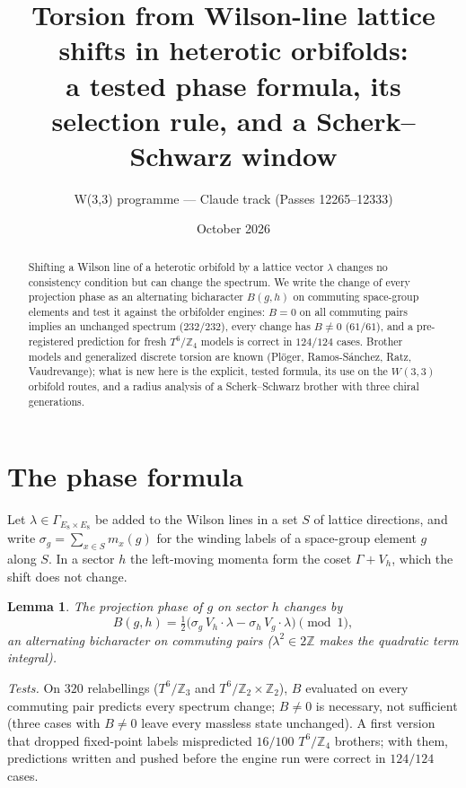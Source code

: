 \documentclass[11pt]{article}
\title{Torsion from Wilson-line lattice shifts in heterotic orbifolds:\\[2pt]
\large a tested phase formula, its selection rule, and a Scherk--Schwarz window}
\author{W(3,3) programme --- Claude track (Passes 12265--12333)}
\date{October 2026}
\newtheorem{lemma}{Lemma}
\begin{document}
\maketitle

\begin{abstract}
Shifting a Wilson line of a heterotic orbifold by a lattice vector $\lambda$ changes no consistency condition but can change the spectrum. We
write the change of every projection phase as an alternating bicharacter $B(g,h)$ on commuting space-group elements and test it against
the orbifolder engines: $B=0$ on all commuting pairs implies an unchanged spectrum ($232/232$), every change has $B\neq0$ ($61/61$), and a
pre-registered prediction for fresh $T^6/\mathbb Z_4$ models is correct in $124/124$ cases. Brother models and generalized discrete
torsion are known (Pl\"oger, Ramos-S\'anchez, Ratz, Vaudrevange); what is new here is the explicit, tested formula, its use on the
$W(3,3)$ orbifold routes, and a radius analysis of a Scherk--Schwarz brother with three chiral generations.
\end{abstract}

\section{The phase formula}
Let $\lambda\in\Gamma_{E_8\times E_8}$ be added to the Wilson lines in a set $S$ of lattice directions, and write $\sigma_g=\sum_{x\in S}m_x(g)$
for the winding labels of a space-group element $g$ along $S$. In a sector $h$ the left-moving momenta form the coset
$\Gamma+V_h$, which the shift does not change.
\begin{lemma}
The projection phase of $g$ on sector $h$ changes by
\[
B(g,h)=\tfrac12\bigl(\sigma_g\,V_h\cdot\lambda-\sigma_h\,V_g\cdot\lambda\bigr)\pmod 1,
\]
an alternating bicharacter on commuting pairs ($\lambda^2\in2\mathbb Z$ makes the quadratic term integral).
\end{lemma}
\emph{Tests.} On $320$ relabellings ($T^6/\mathbb Z_3$ and $T^6/\mathbb Z_2\times\mathbb Z_2$), $B$ evaluated on every commuting pair
predicts every spectrum change; $B\neq0$ is necessary, not sufficient (three cases with $B\neq0$ leave every massless state unchanged).
A first version that dropped fixed-point labels mispredicted $16/100$ $T^6/\mathbb Z_4$ brothers; with them, predictions written and pushed
before the engine run were correct in $124/124$ cases.
\end{document}
